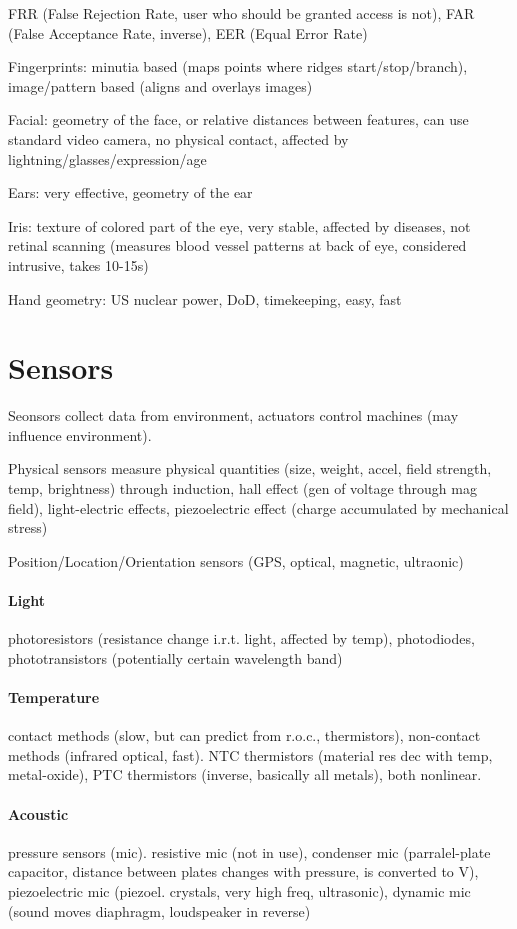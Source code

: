 \documentclass{article}
\begin{document}
\begin{multicols}{2}
    FRR (False Rejection Rate, user who should be granted access is not), FAR (False Acceptance Rate, inverse), EER (Equal Error Rate)

    Fingerprints: minutia based (maps points where ridges start/stop/branch), image/pattern based (aligns and overlays images)

    Facial: geometry of the face, or relative distances between features, can use standard video camera, no physical contact, affected by lightning/glasses/expression/age

    Ears: very effective, geometry of the ear

    Iris: texture of colored part of the eye, very stable, affected by diseases, not retinal scanning (measures blood vessel patterns at back of eye, considered intrusive, takes 10-15s)

    Hand geometry: US nuclear power, DoD, timekeeping, easy, fast

    \section{Sensors}

    Seonsors collect data from environment, actuators control machines (may influence environment).

    Physical sensors measure physical quantities (size, weight, accel, field strength, temp, brightness) through induction, hall effect (gen of voltage through mag field), light-electric effects, piezoelectric effect (charge accumulated by mechanical stress)

    Position/Location/Orientation sensors (GPS, optical, magnetic, ultraonic)

    \paragraph{Light} photoresistors (resistance change i.r.t. light, affected by temp), photodiodes, phototransistors (potentially certain wavelength band)

    \paragraph{Temperature} contact methods (slow, but can predict from r.o.c., thermistors), non-contact methods (infrared optical, fast). NTC thermistors (material res dec with temp, metal-oxide), PTC thermistors (inverse, basically all metals), both nonlinear.

    \paragraph{Acoustic} pressure sensors (mic). resistive mic (not in use), condenser mic (parralel-plate capacitor, distance between plates changes with pressure, is converted to V), piezoelectric mic (piezoel. crystals, very high freq, ultrasonic), dynamic mic (sound moves diaphragm, loudspeaker in reverse)


\end{multicols}
\end{document}
